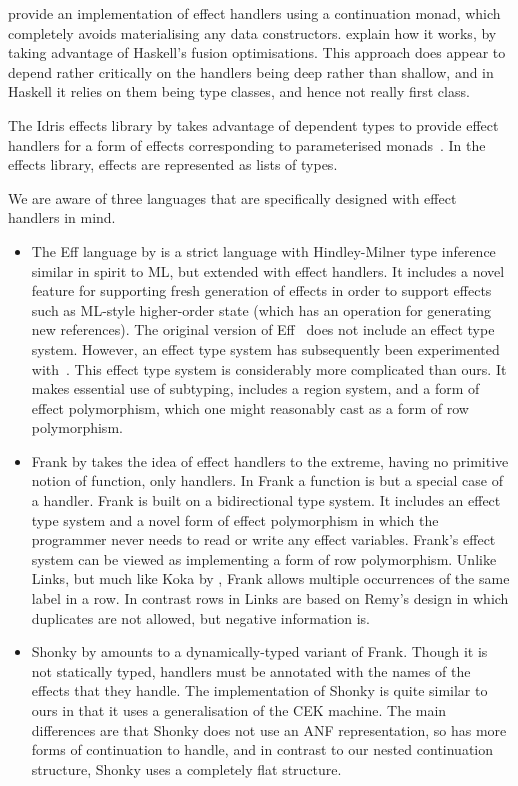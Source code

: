 \documentclass[mscres,cdtppar,twoside,openright,logo,rightchapter,normalheadings]{infthesis}
\theoremstyle{definition}
\begin{document}
\citet{Kammar2013} provide an implementation of effect handlers using
a continuation monad, which completely avoids materialising any data
constructors. \citet{Wu2015} explain how it works, by taking advantage
of Haskell's fusion optimisations. This approach does appear to depend
rather critically on the handlers being deep rather than shallow, and
in Haskell it relies on them being type classes, and hence not really
first class.

The Idris effects library by \cite{Brady2013} takes advantage of
dependent types to provide effect handlers for a form of effects
corresponding to parameterised monads~\citep{Atkey09}.
%
In the effects library, effects are represented as lists of types.

We are aware of three languages that are specifically designed with
effect handlers in mind.
%
\begin{itemize}
\item The Eff language by \cite{Bauer2015} is a strict language with
  Hindley-Milner type inference similar in spirit to ML, but extended
  with effect handlers.
%
It includes a novel feature for supporting fresh generation of effects
in order to support effects such as ML-style higher-order state (which
has an operation for generating new references).
%
The original version of Eff~\citep{Bauer2015} does not include an
effect type system. However, an effect type system has subsequently
been experimented with~\citep{BauerP13, Pretnar2014}.
%
This effect type system is considerably more complicated than ours. It
makes essential use of subtyping, includes a region system, and a form
of effect polymorphism, which one might reasonably cast as a form of
row polymorphism.

\item Frank by \cite{McBride2014} takes the idea of effect handlers to
  the extreme, having no primitive notion of function, only
  handlers. In Frank a function is but a special case of a handler.
  Frank is built on a bidirectional type system. It includes an effect
  type system and a novel form of effect polymorphism in which the
  programmer never needs to read or write any effect
  variables. Frank's effect system can be viewed as implementing a
  form of row polymorphism. Unlike Links, but much like
  Koka by \cite{Leijen14}, Frank allows multiple occurrences of the same
  label in a row. In contrast rows in Links are based on Remy's design
  in which duplicates are not allowed, but negative information is.

\item Shonky by \cite{McBride2016} amounts to a dynamically-typed variant
  of Frank. Though it is not statically typed, handlers must be
  annotated with the names of the effects that they handle. The
  implementation of Shonky is quite similar to ours in that it uses a
  generalisation of the CEK machine. The main differences are that
  Shonky does not use an ANF representation, so has more forms of
  continuation to handle, and in contrast to our nested continuation
  structure, Shonky uses a completely flat structure.
\end{itemize}
\end{document}
